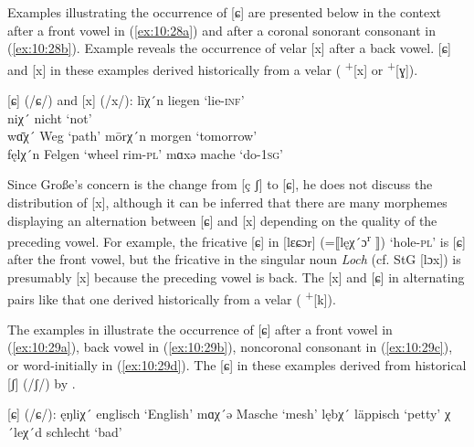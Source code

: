 \begin{xlist}
Examples illustrating the occurrence of [ɕ] are presented below in the context after a front vowel in (\ref{ex:10:28a}) and after a coronal sonorant consonant in (\ref{ex:10:28b}). Example  reveals the occurrence of velar [x] after a back vowel. [ɕ] and [x] in these examples derived historically from a velar ( \textsuperscript{+}[x] or \textsuperscript{+}[ɣ]).

\ea%
\label{ex:10:28} [ɕ] (/ɕ/) and [x] (/x/):
\ea\label{ex:10:28a} līχ´n     \tab [liːɕn̩] \tab  liegen \tab  ‘lie\textsc{{}-inf}’\\
    niχ´      \tab [niɕ]    \tab nicht   \tab ‘not’                \\
    wɑ̄χ´ \tab [væːɕ]   \tab Weg     \tab ‘path’               
\ex\label{ex:10:28b} mōrχ´n    \tab [moːrɕn̩]\tab  morgen \tab  ‘tomorrow’           \\
    fęlχ´n    \tab [fɛlɕn̩] \tab  Felgen \tab  ‘wheel rim-\textsc{pl}’         
\ex\label{ex:10:28c} mɑxə      \tab [mɑxə]   \tab mache   \tab ‘do\textsc{{}-1sg}’  
    \z
\z 

Since Große’s concern is the change from [ç ʃ] to [ɕ], he does not discuss the distribution of [x], although it can be inferred that there are many morphemes displaying an alternation between [ɕ] and [x] depending on the quality of the preceding vowel. For example, the fricative [ɕ] in [lɛɕɔr] (=⟦lęχ´ɔ\textsuperscript{r} ⟧) ‘hole-\textsc{pl}’ is [ɕ] after the front vowel, but the fricative in the singular noun \textit{Loch} (cf. StG [lɔx]) is presumably [x] because the preceding vowel is back. The [x] and [ɕ] in alternating pairs like that one derived historically from a velar ( \textsuperscript{+}[k]).

The examples in  illustrate the occurrence of [ɕ] after a front vowel in (\ref{ex:10:29a}), back vowel in (\ref{ex:10:29b}), noncoronal consonant in (\ref{ex:10:29c}), or word-initially in (\ref{ex:10:29d}). The [ɕ] in these examples derived from historical [ʃ] (/ʃ/) by .

\ea%
\label{ex:10:29} [ɕ] (/ɕ/):
\ea\label{ex:10:29a}ęŋliχ´  \tab [ɛŋliɕ] \tab  englisch \tab ‘English’ 
\ex\label{ex:10:29b}mɑχ´ə   \tab [mɑɕə]  \tab  Masche   \tab ‘mesh’    
\ex\label{ex:10:29c}lębχ´   \tab [lɛpɕ]  \tab  läppisch \tab  ‘petty’  
\ex\label{ex:10:29d}χ´leχ´d \tab [ɕleɕt] \tab  schlecht \tab ‘bad’     
\z 
\z


\end{xlist}
